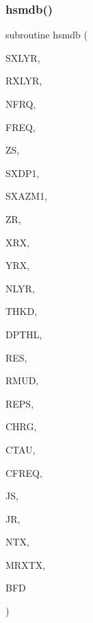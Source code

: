\subsubsection{\texorpdfstring{hsmdb()}{hsmdb()}}
{\footnotesize\ttfamily subroutine hsmdb (\begin{DoxyParamCaption}\item[{integer}]{S\+X\+L\+YR,  }\item[{integer}]{R\+X\+L\+YR,  }\item[{integer}]{N\+F\+RQ,  }\item[{real, dimension(nfrq)}]{F\+R\+EQ,  }\item[{real(kind=ql)}]{ZS,  }\item[{real}]{S\+X\+D\+P1,  }\item[{real}]{S\+X\+A\+Z\+M1,  }\item[{real(kind=ql)}]{ZR,  }\item[{real}]{X\+RX,  }\item[{real}]{Y\+RX,  }\item[{integer}]{N\+L\+YR,  }\item[{real(kind=ql), dimension(nlyr)}]{T\+H\+KD,  }\item[{real(kind=ql), dimension(nlyr)}]{D\+P\+T\+HL,  }\item[{real, dimension(nlyr)}]{R\+ES,  }\item[{real(kind=ql), dimension(0\+:nlyr)}]{R\+M\+UD,  }\item[{real, dimension(nlyr)}]{R\+E\+PS,  }\item[{real, dimension(nlyr)}]{C\+H\+RG,  }\item[{real, dimension(nlyr)}]{C\+T\+AU,  }\item[{real, dimension(nlyr)}]{C\+F\+R\+EQ,  }\item[{integer}]{JS,  }\item[{integer}]{JR,  }\item[{integer}]{N\+TX,  }\item[{integer}]{M\+R\+X\+TX,  }\item[{complex, dimension(nfrq,mrxtx,ntx,3)}]{B\+FD }\end{DoxyParamCaption})}

